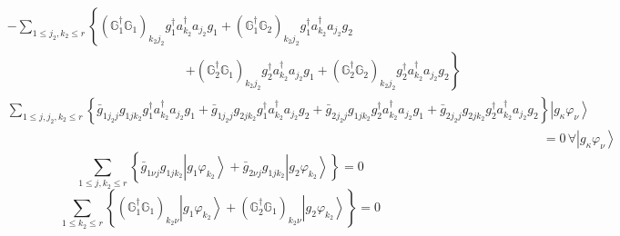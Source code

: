 \documentclass[aps,preprint]{revtex4}%
\begin{document}
\begin{align}
&  -\sum_{1\leq j_{2},k_{2}\leq r}\left\{  \left(  \mathbb{G}_{1}^{\dagger
}\mathbb{G}_{1}\right)  _{k_{2}j_{2}}g_{1}^{\dagger}a_{k_{2}}^{\dagger
}a_{j_{2}}g_{1}+\left(  \mathbb{G}_{1}^{\dagger}\mathbb{G}_{2}\right)
_{k_{2}j_{2}}g_{1}^{\dagger}a_{k_{2}}^{\dagger}a_{j_{2}}g_{2}\right.
\nonumber\\
&  \qquad\qquad\qquad\qquad\qquad\qquad\qquad\left.  +\left(  \mathbb{G}%
_{2}^{\dagger}\mathbb{G}_{1}\right)  _{k_{2}j_{2}}g_{2}^{\dagger}a_{k_{2}%
}^{\dagger}a_{j_{2}}g_{1}+\left(  \mathbb{G}_{2}^{\dagger}\mathbb{G}%
_{2}\right)  _{k_{2}j_{2}}g_{2}^{\dagger}a_{k_{2}}^{\dagger}a_{j_{2}}%
g_{2}\right\}
\end{align}%
\begin{align}
&  \sum_{1\leq j,j_{2},k_{2}\leq r}\left\{  \bar{g}_{1j_{2}j}g_{1jk_{2}}%
g_{1}^{\dagger}a_{k_{2}}^{\dagger}a_{j_{2}}g_{1}+\bar{g}_{1j_{2}j}g_{2jk_{2}%
}g_{1}^{\dagger}a_{k_{2}}^{\dagger}a_{j_{2}}g_{2}+\bar{g}_{2j_{2}j}g_{1jk_{2}%
}g_{2}^{\dagger}a_{k_{2}}^{\dagger}a_{j_{2}}g_{1}+\bar{g}_{2j_{2}j}g_{2jk_{2}%
}g_{2}^{\dagger}a_{k_{2}}^{\dagger}a_{j_{2}}g_{2}\right\}  \left\vert
g_{\kappa}\varphi_{\nu}\right\rangle \nonumber\\
&  \qquad\qquad\qquad\qquad\qquad\qquad\qquad\qquad\qquad\qquad\qquad
\qquad\qquad\qquad\qquad\qquad\qquad\qquad\qquad\qquad\qquad\left.  =\right.
0\,\forall\left\vert g_{\kappa}\varphi_{\nu}\right\rangle
\end{align}%
\begin{equation}
\sum_{1\leq j,k_{2}\leq r}\left\{  \bar{g}_{1\nu j}g_{1jk_{2}}\left\vert
g_{1}\varphi_{k_{2}}\right\rangle +\bar{g}_{2\nu j}g_{1jk_{2}}\left\vert
g_{2}\varphi_{k_{2}}\right\rangle \right\}  =0\,
\end{equation}%
\begin{equation}
\sum_{1\leq k_{2}\leq r}\left\{  \left(  \mathbb{G}_{1}^{\dagger}%
\mathbb{G}_{1}\right)  _{k_{2}\nu}\left\vert g_{1}\varphi_{k_{2}}\right\rangle
+\left(  \mathbb{G}_{2}^{\dagger}\mathbb{G}_{1}\right)  _{k_{2}\nu}\left\vert
g_{2}\varphi_{k_{2}}\right\rangle \right\}  =0\,
\end{equation}%
\end{document}
